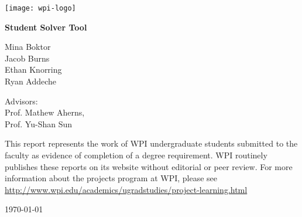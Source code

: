 \documentclass[11pt]{article}
\begin{document}
\begin{titlepage}
	\centering
	\texttt{[image: wpi-logo]}\par\vspace{2cm}

	{\Huge \bfseries Student Solver Tool \par}
	\vspace{1.5cm}

	{\Large Mina Boktor \\ Jacob Burns \\ Ethan Knorring \\ Ryan Addeche \par}
	\vspace{1cm}

	{\large Advisors: \\ Prof. Mathew Aherns, \\ Prof. Yu-Shan Sun\par}
	\vfill

	{\small This report represents the work of WPI undergraduate students submitted to the faculty as evidence of completion of a degree requirement. WPI routinely publishes these reports on its website without editorial or peer review. For more information about the projects program at WPI, please see \url{http://www.wpi.edu/academics/ugradstudies/project-learning.html}\par}

	\vspace{1cm}
	{\large \today \par}
\end{titlepage}

\tableofcontents
\clearpage






\printbibliography
\end{document}
